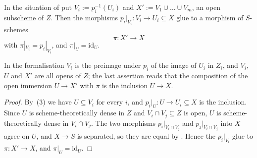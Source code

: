 \begin{lemma}\label{lem:chow-glue}
\leanok
In the situation of  put $V_i:=p_i^{-1}(U_i)$ and
$X':=V_1\cup\dots\cup V_m$, an open subscheme of $Z$.  Then the morphisms
$p_i|_{V_i}\colon V_i\to U_i\subseteq X$ glue to a morphism of $S$-schemes
\[
  \pi\colon X'\longrightarrow X
\]
with $\pi|_{V_i}=p_i|_{V_i}$, and $\pi|_U=\mathrm{id}_U$.

In the formalisation $V_i$ is the preimage under $p_i$ of the image of $U_i$ in
$Z_i$, and $V_i$, $U$ and $X'$ are all opens of $Z$; the last assertion reads
that the composition of the open immersion $U\to X'$ with $\pi$ is the inclusion
$U\to X$.
\end{lemma}
\begin{proof}
\leanok
By \,(3) we have $U\subseteq V_i$ for every $i$, and
$p_i|_U\colon U\to U_i\subseteq X$ is the inclusion.  Since $U$ is
scheme-theoretically dense in $Z$ and $V_i\cap V_j\subseteq Z$ is open, $U$ is
scheme-theoretically dense in $V_i\cap V_j$.  The two morphisms
$p_i|_{V_i\cap V_j}$ and $p_j|_{V_i\cap V_j}$ into $X$ agree on $U$, and
$X\to S$ is separated, so they are equal by
.  Hence the $p_i|_{V_i}$ glue to
$\pi\colon X'\to X$, and $\pi|_U=\mathrm{id}_U$.
\end{proof}

